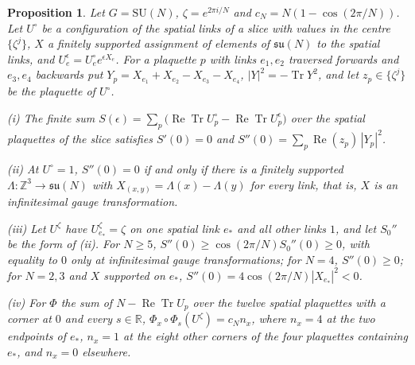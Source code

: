 \documentclass[aps,prd,twocolumn,superscriptaddress,nofootinbib,longbibliography,floatfix,amsmath,amssymb,10pt]{revtex4-2}
\newtheorem{proposition}[theorem]{Proposition}
\theoremstyle{definition}
\theoremstyle{remark}
\newcommand{\R}{\mathbb{R}}
\newcommand{\Z}{\mathbb{Z}}
\newcommand{\SU}{\mathrm{SU}}
\newcommand{\Tr}{\operatorname{Tr}}
\newcommand{\ReTr}{\operatorname{Re}\operatorname{Tr}}
\begin{document}
\begin{proposition}\label{prop:centralsecond}
Let $G=\SU(N)$, $\zeta=e^{2\pi i/N}$ and $c_N=N(1-\cos(2\pi/N))$. Let
$U^\circ$ be a configuration of the spatial links of a slice with values in
the centre $\{\zeta^j\}$, $X$ a finitely supported assignment of elements
of $\mathfrak{su}(N)$ to the spatial links, and $U^\epsilon_e=U^\circ_e
e^{\epsilon X_e}$. For a plaquette $p$ with links $e_1,e_2$ traversed
forwards and $e_3,e_4$ backwards put $Y_p=X_{e_1}+X_{e_2}-X_{e_3}-X_{e_4}$,
$|Y|^2=-\Tr Y^2$, and let $z_p\in\{\zeta^j\}$ be the plaquette of
$U^\circ$.

\textup{(i)} The finite sum $S(\epsilon)=\sum_p\bigl(\ReTr U^\circ_p-\ReTr
U^\epsilon_p\bigr)$ over the spatial plaquettes of the slice satisfies
$S'(0)=0$ and $S''(0)=\sum_p\operatorname{Re}(z_p)\,|Y_p|^2$.

\textup{(ii)} At $U^\circ=1$, $S''(0)=0$ if and only if there is a finitely
supported $\Lambda:\Z^3\to\mathfrak{su}(N)$ with $X_{(x,y)}=\Lambda(x)-
\Lambda(y)$ for every link, that is, $X$ is an infinitesimal gauge
transformation.

\textup{(iii)} Let $U^\zeta$ have $U^\zeta_{e_*}=\zeta$ on one spatial link
$e_*$ and all other links $1$, and let $S_0''$ be the form of \textup{(ii)}.
For $N\ge5$, $S''(0)\ge\cos(2\pi/N)S_0''(0)\ge0$, with equality to $0$ only
at infinitesimal gauge transformations; for $N=4$, $S''(0)\ge0$; for
$N=2,3$ and $X$ supported on $e_*$, $S''(0)=4\cos(2\pi/N)|X_{e_*}|^2<0$.

\textup{(iv)} For $\Phi$ the sum of $N-\ReTr U_p$ over the twelve spatial
plaquettes with a corner at $0$ and every $s\in\R$, $\Phi_x\circ\Phi_s
(U^\zeta)=c_Nn_x$, where $n_x=4$ at the two endpoints of $e_*$, $n_x=1$ at
the eight other corners of the four plaquettes containing $e_*$, and
$n_x=0$ elsewhere.
\end{proposition}
\end{document}

